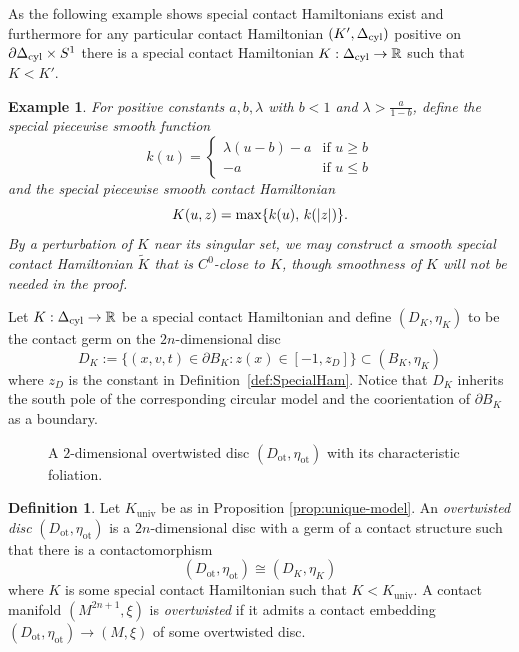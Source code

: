 \documentclass[12pt]{paper}
\theoremstyle{plain}
\newtheorem{ex}[theorem]{Example}
\theoremstyle{definition}
\newtheorem{definition}[theorem]{Definition}
\newcommand{\p}{\partial}
\newcommand{\abs}[1]{\left| #1 \right|}
\newcommand{\R}{{\mathbb{R}}}
\newcommand{\cyl}{{\rm cyl}}
\renewcommand{\max}{{\rm max}}
\newcommand{\univ}{\mathrm{univ}}
\newcommand{\ot}{\mathrm{ot}}
\numberwithin{figure}{section}
\begin{document}
As the following example shows special contact Hamiltonians exist and furthermore for any particular contact Hamiltonian $(K',\Delta_\cyl)$  positive on $\p\Delta_\cyl\times S^1$ there is a special contact Hamiltonian $K: \Delta_\cyl \to \R$ such that $K < K'$.
\begin{ex}\label{ex:special}{\rm
	For positive constants $a, b, \lambda$ with $b < 1$ and $\lambda > \tfrac{a}{1-b}$, define the 
	special piecewise smooth function
	$$
		k(u) = \begin{cases}
		\lambda(u-b) - a &   \mbox{if $u \geq b$}\\
		-a & \mbox{if $u \leq b$}
		\end{cases}
	$$
	and the special piecewise smooth contact Hamiltonian
	$$
		K(u,z) = \max\{k(u),\,k(\abs{z})\}.
	$$
	By a perturbation of $K$ near its singular set, we may construct a smooth
	special contact Hamiltonian $\tilde{K}$ that is $C^0$-close to $K$, though smoothness of $K$ will not be needed in the proof.}
\end{ex}



Let $K:\Delta_\cyl\to\R$ be a special contact Hamiltonian
and define $(D_{K}, \eta_{K})$ to be the contact germ on the 
$2n$-dimensional disc
\begin{equation}\label{eq:ot-disc}
	D_{K} := \{(x, v, t) \in \p B_{K}: z(x) \in   [-1, z_D]\} \subset (B_{K}, \eta_{K})
\end{equation}
where $z_D$ is the constant in Definition~\ref{def:SpecialHam}.
Notice that $D_{K}$ inherits the south pole of the corresponding circular
model and the coorientation of $\p B_{K}$ as a boundary. 

\begin{figure}
   \centering
   \def\svgwidth{50pt}
   
   \caption{A $2$-dimensional overtwisted disc $(D_{\ot}, \eta_{\ot})$ with its characteristic foliation.}
  \label{f:Disk}
\end{figure} 

\begin{definition}\label{def:OTD}
	Let $K_{\univ}$ be as in Proposition \ref{prop:unique-model}.
	An \emph{overtwisted disc} $(D_\ot,\eta_\ot)$ is a $2n$-dimensional disc with a germ of a contact structure
	such that there is a contactomorphism
	$$
		(D_\ot,\eta_\ot) \cong \left(D_{K}, \eta_{K}\right)
	$$
	where $K$ is some special contact Hamiltonian such that $K < K_\univ$.
	A contact manifold $(M^{2n+1}, \xi)$ is {\em overtwisted} if it admits a contact embedding 
	$(D_\ot,\eta_\ot)\to (M,\xi)$ of some overtwisted disc.
\end{definition}
\end{document}
